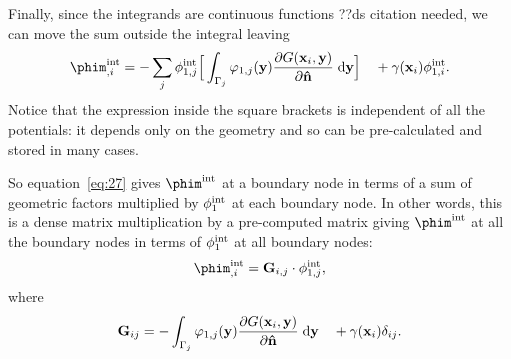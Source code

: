 Finally, since the integrands are continuous functions ??ds citation needed, we can move the sum outside the integral leaving
\begin{equation}
  \phim_{,\ibasis}^\inte =
  - \sum_\ibasisb \phi^\inte_{1,\ibasisb} \Big[ \int_{\boundd_\ibasisb} \tbf_{1,\ibasisb}(\yv)
  \pd{\Green[\ibasis]}{\nv} \d \yv \Big]
  \quad + \gamma(\xv_\ibasis) \phi^\inte_{1,\ibasis}.
\label{eq:27}
\end{equation}
Notice that the expression inside the square brackets is independent of all the potentials: it depends only on the geometry and so can be pre-calculated and stored in many cases.

So equation~\eqref{eq:27} gives $\phim^\inte$ at a boundary node in terms of a sum of geometric factors multiplied by $\phi^{\text{int}}_1$ at each boundary node.
In other words, this is a dense matrix multiplication by a pre-computed matrix giving $\phim^\inte$ at all the boundary nodes in terms of $\phi^{\text{int}}_1$ at all boundary nodes:
\begin{equation}
  \label{eq:10}
  \phim_{,\ibasis}^\inte = \bm_{\ibasis,\ibasisb} \cdot \phi_{1,\ibasisb}^\inte,
\end{equation}
where
\begin{equation}
  \label{eq:17}
  \bm_{\ibasis\ibasisb} = - \int_{\boundd_\ibasisb} \tbf_{1,\ibasisb}(\yv) \pd{\Green[\ibasis]}{\nv} \d \yv
  \quad + \gamma(\xv_\ibasis)\delta_{\ibasis\ibasisb}.
\end{equation}



